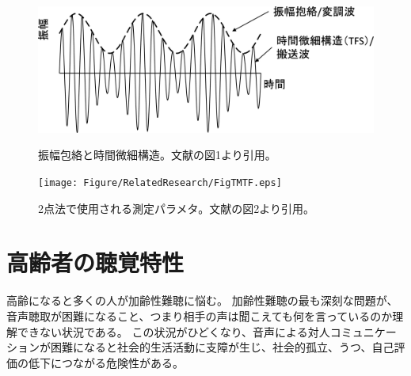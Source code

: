 \begin{figure}[h]
    \begin{minipage}[b]{0.5\hsize}
        \vspace{50pt}
        \centering
        \includegraphics[width=1.07\hsize]{Figure/RelatedResearch/furukawa2016time.eps}
        \caption{振幅包絡と時間微細構造。文献\cite{furukawa2016time}の図1より引用。}
        \label{fig:TFS}
    \end{minipage}
    \hspace{0.05\hsize}
    \begin{minipage}[b]{0.45\hsize}
        \vspace{50pt}
        \centering
        \texttt{[image: Figure/RelatedResearch/FigTMTF.eps]}
        \caption{2点法で使用される測定パラメタ。文献\cite{morimoto2019Two-PointTMTF}の図2より引用。}
        \label{fig:TMTF}
    \end{minipage}
    
\end{figure}



\clearpage
\section{高齢者の聴覚特性}
高齢になると多くの人が加齢性難聴に悩む。
加齢性難聴の最も深刻な問題が、音声聴取が困難になること、つまり相手の声は聞こえても何を言っているのか理解できない状況である。
この状況がひどくなり、音声による対人コミュニケーションが困難になると社会的生活活動に支障が生じ、社会的孤立、うつ、自己評価の低下につながる危険性がある。

